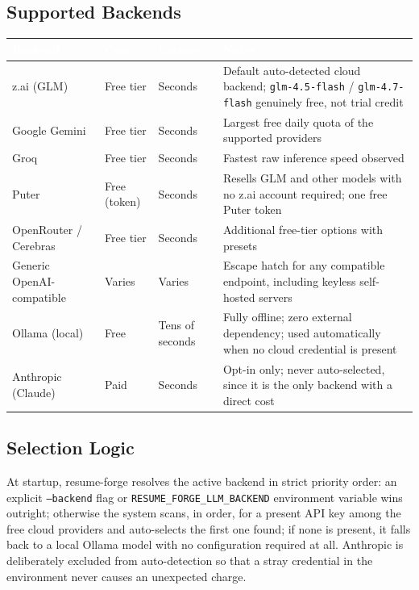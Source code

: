 \documentclass[10.5pt,letterpaper]{article}
\begin{document}
\subsection{Supported Backends}
\begin{tabularx}{\textwidth}{@{}l l l X@{}}
\toprule
\rowcolor{brandIndigoDark}
\textcolor{white}{\textbf{Backend}} & \textcolor{white}{\textbf{Cost}} &
\textcolor{white}{\textbf{Latency}} & \textcolor{white}{\textbf{Notes}} \\
\midrule
z.ai (GLM) & Free tier & Seconds & Default auto-detected cloud backend; \texttt{glm-4.5-flash}
  / \texttt{glm-4.7-flash} genuinely free, not trial credit \\
\rowcolor{brandBgGray}
Google Gemini & Free tier & Seconds & Largest free daily quota of the supported providers \\
Groq & Free tier & Seconds & Fastest raw inference speed observed \\
\rowcolor{brandBgGray}
Puter & Free (token) & Seconds & Resells GLM and other models with no z.ai account
  required; one free Puter token \\
OpenRouter / Cerebras & Free tier & Seconds & Additional free-tier options with presets \\
\rowcolor{brandBgGray}
Generic OpenAI-compatible & Varies & Varies & Escape hatch for any compatible endpoint,
  including keyless self-hosted servers \\
Ollama (local) & Free & Tens of seconds & Fully offline; zero external dependency; used
  automatically when no cloud credential is present \\
\rowcolor{brandBgGray}
Anthropic (Claude) & Paid & Seconds & Opt-in only; never auto-selected, since it is the
  only backend with a direct cost \\
\bottomrule
\end{tabularx}

\subsection{Selection Logic}
At startup, resume-forge resolves the active backend in strict priority order: an explicit
\texttt{--backend} flag or \texttt{RESUME\_FORGE\_LLM\_BACKEND} environment variable wins
outright; otherwise the system scans, in order, for a present API key among the free cloud
providers and auto-selects the first one found; if none is present, it falls back to a local
Ollama model with no configuration required at all. Anthropic is deliberately excluded from
auto-detection so that a stray credential in the environment never causes an unexpected
charge.
\end{document}
